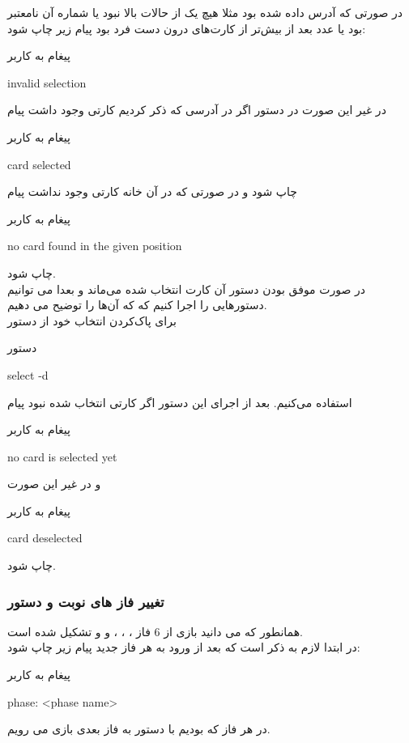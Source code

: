 \documentclass[]{article}
\begin{document}
در صورتی که آدرس داده شده  بود مثلا هیچ یک از حالات بالا نبود یا 
شماره آن نامعتبر بود یا عدد بعد از  بیش‌تر از کارت‌های درون دست 
فرد بود پیام زیر چاپ شود:
\begin{mybox}[colback=yellow]{پیغام به کاربر}
	\begin{latin}	
		invalid selection
	\end{latin}
\end{mybox}
در غیر این صورت در دستور  اگر در آدرسی که ذکر کردیم کارتی وجود 
داشت پیام
\begin{mybox}[colback=yellow]{پیغام به کاربر}
	\begin{latin}	
		card selected
	\end{latin}
\end{mybox}
چاپ شود و در صورتی که در آن خانه کارتی وجود نداشت پیام 
\begin{mybox}[colback=yellow]{پیغام به کاربر}
	\begin{latin}	
		no card found in the given position
	\end{latin}
\end{mybox}
چاپ شود.
\\
در صورت موفق بودن دستور  آن کارت انتخاب شده می‌ماند و بعدا می 
توانیم دستورهایی را اجرا کنیم که که آن‌ها را توضیح می دهیم.
\\
برای پاک‌کردن انتخاب خود از دستور 
\begin{mybox}[colback=yellow]{دستور}
	\begin{latin}	
		select -d
	\end{latin}
\end{mybox}
استفاده می‌کنیم. بعد از اجرای این دستور اگر کارتی انتخاب شده نبود پیام
\begin{mybox}[colback=yellow]{پیغام به کاربر}
	\begin{latin}	
		no card is selected yet
	\end{latin}
\end{mybox}
و در غیر این صورت
\begin{mybox}[colback=yellow]{پیغام به کاربر}
	\begin{latin}	
		card deselected
	\end{latin}
\end{mybox}
چاپ شود.

\subsubsection*{{\titr تغییر فاز های نوبت و دستور }}
همانطور که می دانید بازی از 6 فاز
  ،  ،  ،  و 
  و 
 تشکیل شده است.
\\
    در ابتدا لازم به ذکر است که بعد از ورود به هر فاز جدید پیام زیر چاپ شود:
\begin{mybox}[colback=yellow]{پیغام به کاربر}
	\begin{latin}	
		phase: <phase name>
	\end{latin}
\end{mybox}
    در هر فاز که بودیم با دستور  به فاز بعدی بازی می رویم.
\end{document}
